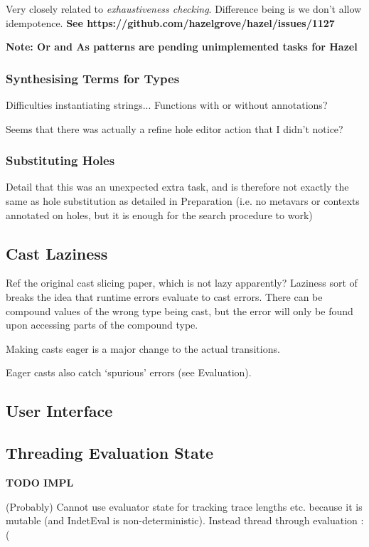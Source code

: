 Very closely related to \textit{exhaustiveness checking}. Difference being is we don't allow idempotence. \textbf{See {https://github.com/hazelgrove/hazel/issues/1127}}

\textbf{Note: Or and As patterns are pending unimplemented tasks for Hazel}

\subsubsection{Synthesising Terms for Types}
Difficulties instantiating strings...
Functions with or without annotations?

Seems that there was actually a refine hole editor action that I didn't notice?

\subsubsection{Substituting Holes}\label{sec:HoleSubstitutionImplementation}
Detail that this was an unexpected extra task, and is therefore not exactly the same as hole substitution as detailed in Preparation (i.e. no metavars or contexts annotated on holes, but it is enough for the search procedure to work)

\subsection{Cast Laziness}\label{sec:CastLaziness}
Ref the original cast slicing paper, which is not lazy apparently? Laziness sort of breaks the idea that runtime errors evaluate to cast errors. There can be compound values of the wrong type being cast, but the error will only be found upon accessing parts of the compound type.

Making casts eager is a major change to the actual transitions.

Eager casts also catch `spurious' errors (see Evaluation).


\subsection{User Interface}

\subsection{Threading Evaluation State}
\textbf{TODO IMPL}

(Probably) Cannot use evaluator state for tracking trace lengths etc. because it is mutable (and IndetEval is non-deterministic). Instead thread through evaluation :(

